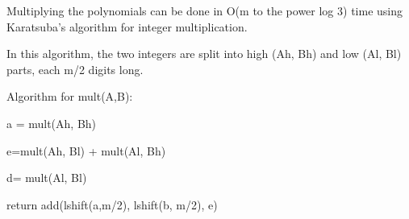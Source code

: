 \documentclass[12pt]{article}
\begin{document}
Multiplying the polynomials can be done in O(m to the power log 3) time using Karatsuba's algorithm for integer multiplication. 

In this algorithm, the two integers are split into high (Ah, Bh) and low (Al, Bl) parts, each m/2 digits long. 

Algorithm for mult(A,B):

a = mult(Ah, Bh)

e=mult(Ah, Bl) + mult(Al, Bh)

d= mult(Al, Bl)

return add(lshift(a,m/2), lshift(b, m/2), e)
\end{document}
